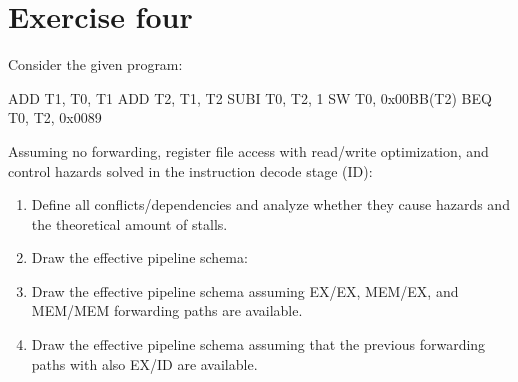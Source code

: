 \section{Exercise four}

Consider the given program:
\begin{verbnobox}[\verbarg]
ADD T1, T0, T1
ADD T2, T1, T2
SUBI T0, T2, 1
SW T0, 0x00BB(T2)
BEQ T0, T2, 0x0089   
\end{verbnobox}
Assuming no forwarding, register file access with read/write optimization, and control hazards solved in the instruction decode stage (ID):
\begin{enumerate}
    \item Define all conflicts/dependencies and analyze whether they cause hazards and the theoretical amount of stalls.
    \item Draw the effective pipeline schema:
    \item Draw the effective pipeline schema assuming EX/EX, MEM/EX, and MEM/MEM forwarding paths are available. 
    \item Draw the effective pipeline schema assuming that the previous forwarding paths with also EX/ID are available.
\end{enumerate}


